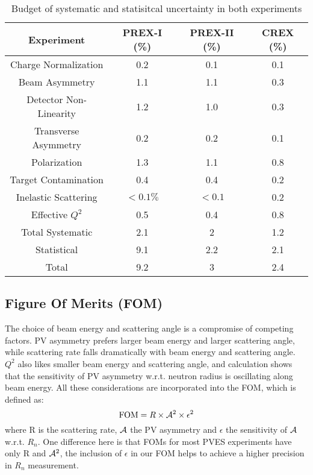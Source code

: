 \begin{table}[hbt!]
    \centering
    \begin{tabular}{c| c c c}
	\hline
	Experiment  & PREX-I (\%)   & PREX-II (\%)	& CREX (\%)	\\
	\hline
	Charge Normalization	& 0.2	& 0.1	& 0.1	\\
	Beam Asymmetry		& 1.1	& 1.1	& 0.3	\\
	Detector Non-Linearity	& 1.2	& 1.0	& 0.3	\\
	Transverse Asymmetry	& 0.2	& 0.2	& 0.1	\\
	Polarization		& 1.3	& 1.1	& 0.8	\\
	Target Contamination	& 0.4	& 0.4	& 0.2	\\
	Inelastic Scattering	& $<0.1\%$  & $<0.1$    & 0.2   \\
	Effective $Q^2$		& 0.5	& 0.4	& 0.8	\\
	\hline
	Total Systematic	& 2.1	& 2	& 1.2	\\
	Statistical		& 9.1	& 2.2	& 2.1	\\
	\hline
	Total			& 9.2	& 3	& 2.4	\\
	\hline
    \end{tabular}
    \caption{Budget of systematic and statisitcal uncertainty in both experiments 
    \cite{prex-II_proposal, crex_proposal}
    }
\end{table}


\subsection{Figure Of Merits (FOM)}
The choice of beam energy and scattering angle is a compromise of competing
factors. PV asymmetry prefers larger beam energy and larger scattering angle,
while scattering rate falls dramatically with beam energy and scattering angle.
$Q^2$ also likes smaller beam energy and scattering angle, and calculation 
shows that the sensitivity of PV asymmetry w.r.t. neutron radius is oscillating
along beam energy. All these considerations are incorporated into the FOM, which
is defined as:
\begin{equation}
    \text{FOM} = R \times \mathcal{A}^2 \times \epsilon^2
\end{equation}
where R is the scattering rate, $\mathcal{A}$ the PV asymmetry and $\epsilon$ 
the sensitivity of $\mathcal{A}$ w.r.t. $R_n$. One difference here is that FOMs for most PVES 
experiments have only R and $\mathcal{A}^2$, the inclusion of $\epsilon$ in our FOM helps
to achieve a higher precision in $R_n$ measurement.

